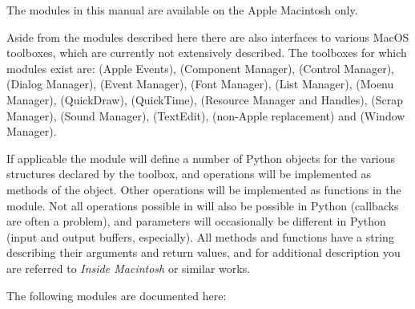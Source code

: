 The modules in this manual are available on the Apple Macintosh only.

Aside from the modules described here there are also interfaces to
various MacOS toolboxes, which are currently not extensively
described. The toolboxes for which modules exist are:
 (Apple Events),
 (Component Manager),
 (Control Manager),
 (Dialog Manager),
 (Event Manager),
 (Font Manager),
 (List Manager),
 (Moenu Manager),
 (QuickDraw),
 (QuickTime),
 (Resource Manager and Handles),
 (Scrap Manager),
 (Sound Manager),
 (TextEdit),
 (non-Apple  replacement) and
 (Window Manager).

If applicable the module will define a number of Python objects for
the various structures declared by the toolbox, and operations will be
implemented as methods of the object. Other operations will be
implemented as functions in the module. Not all operations possible in
\C{} will also be possible in Python (callbacks are often a problem), and
parameters will occasionally be different in Python (input and output
buffers, especially). All methods and functions have a 
string describing their arguments and return values, and for
additional description you are referred to \emph{Inside Macintosh} or
similar works.

The following modules are documented here:

